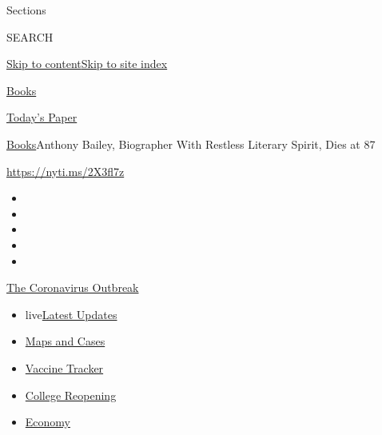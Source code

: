 Sections

SEARCH

\protect\hyperlink{site-content}{Skip to
content}\protect\hyperlink{site-index}{Skip to site index}

\href{https://www.nytimes.com/section/books}{Books}

\href{https://myaccount.nytimes.com/auth/login?response_type=cookie\&client_id=vi}{}

\href{https://www.nytimes.com/section/todayspaper}{Today's Paper}

\href{/section/books}{Books}\textbar{}Anthony Bailey, Biographer With
Restless Literary Spirit, Dies at 87

\url{https://nyti.ms/2X3fl7z}

\begin{itemize}
\item
\item
\item
\item
\item
\end{itemize}

\href{https://www.nytimes.com/news-event/coronavirus?action=click\&pgtype=Article\&state=default\&region=TOP_BANNER\&context=storylines_menu}{The
Coronavirus Outbreak}

\begin{itemize}
\tightlist
\item
  live\href{https://www.nytimes.com/2020/08/03/world/coronavirus-covid-19.html?action=click\&pgtype=Article\&state=default\&region=TOP_BANNER\&context=storylines_menu}{Latest
  Updates}
\item
  \href{https://www.nytimes.com/interactive/2020/us/coronavirus-us-cases.html?action=click\&pgtype=Article\&state=default\&region=TOP_BANNER\&context=storylines_menu}{Maps
  and Cases}
\item
  \href{https://www.nytimes.com/interactive/2020/science/coronavirus-vaccine-tracker.html?action=click\&pgtype=Article\&state=default\&region=TOP_BANNER\&context=storylines_menu}{Vaccine
  Tracker}
\item
  \href{https://www.nytimes.com/2020/08/02/us/covid-college-reopening.html?action=click\&pgtype=Article\&state=default\&region=TOP_BANNER\&context=storylines_menu}{College
  Reopening}
\item
  \href{https://www.nytimes.com/live/2020/08/03/business/stock-market-today-coronavirus?action=click\&pgtype=Article\&state=default\&region=TOP_BANNER\&context=storylines_menu}{Economy}
\end{itemize}

